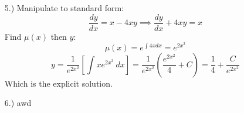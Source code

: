 \documentclass[12pt]{article}
\newcommand{\bracks}[1]{\left[#1\right]}
\newcommand{\derv}[2]{\dfrac{d#1}{d#2}}
\begin{document}
\begin{itemize}
    \pagebreak
    \item [5.)] Manipulate to standard form:
    \begin{equation*}
        \derv{y}{x}=x-4xy\implies\derv{y}{x}+4xy=x
    \end{equation*}
    Find $\mu(x)$ then $y$:
    \begin{equation*}
        \mu(x)=e^{\int4xdx}=e^{2x^2}
    \end{equation*}
    \begin{equation*}
        y=\dfrac{1}{e^{2x^2}}\bracks{\int xe^{2x^2}\ dx}=\dfrac{1}{e^{2x^2}}\left(\dfrac{e^{2x^2}}{4}+C\right)=\dfrac{1}{4}+\dfrac{C}{e^{2x^2}}
    \end{equation*}
    Which is the explicit solution.

    \item [6.)] awd

\end{itemize}
\end{document}
